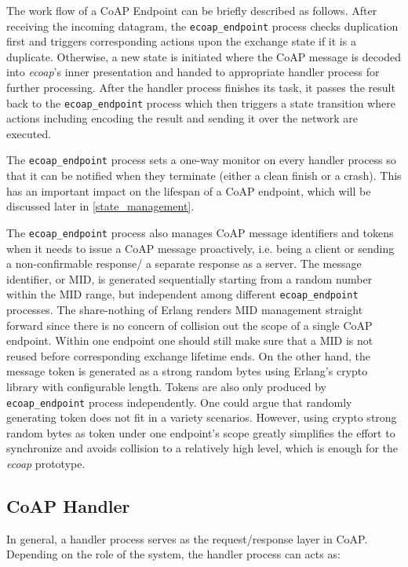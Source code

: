 The work flow of a CoAP Endpoint can be briefly described as follows. After receiving the incoming datagram, the \verb|ecoap_endpoint| process checks duplication first and triggers corresponding actions upon the exchange state if it is a duplicate. Otherwise, a new state is initiated where the CoAP message is decoded into \textit{ecoap}'s inner presentation and handed to appropriate handler process for further processing. After the handler process finishes its task, it passes the result back to the \verb|ecoap_endpoint| process which then  triggers a state transition where actions including encoding the result and sending it over the network are executed.

The \verb|ecoap_endpoint| process sets a one-way monitor on every handler process so that it can be notified when they terminate (either a clean finish or a crash). This has an important impact on the lifespan of a CoAP endpoint, which will be discussed later in \ref{state_management}. 

The \verb|ecoap_endpoint| process also manages CoAP message identifiers and tokens when it needs to issue a CoAP message proactively, i.e. being a client or sending a non-confirmable response/ a separate response as a server. The message identifier, or MID, is generated sequentially starting from a random number within the MID range, but independent among different \verb|ecoap_endpoint| processes. The share-nothing of Erlang renders MID management straight forward since there is no concern of collision out the scope of a single CoAP endpoint. Within one endpoint one should still make sure that a MID is not reused before corresponding exchange lifetime ends. On the other hand, the message token is generated as a strong random bytes using Erlang's crypto library with configurable length. Tokens are also only produced by  \verb|ecoap_endpoint| process independently. One could argue that randomly generating token does not fit in a variety scenarios. However, using crypto strong random bytes as token under one endpoint's scope greatly simplifies the effort to synchronize and avoids collision to a relatively high level, which is enough for the \textit{ecoap} prototype.

\subsection{CoAP Handler}

In general, a handler process serves as the request/response layer in CoAP. Depending on the role of the system, the handler process can acts as:

